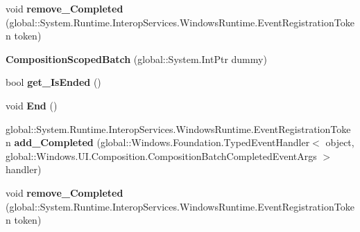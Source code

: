 \begin{DoxyCompactItemize}
\item 
\mbox{\label{class_windows_1_1_u_i_1_1_composition_1_1_composition_scoped_batch_a1fca5e233b1f087147733edf215d083d}} 
void {\bfseries remove\+\_\+\+Completed} (global\+::\+System.\+Runtime.\+Interop\+Services.\+Windows\+Runtime.\+Event\+Registration\+Token token)
\item 
\mbox{\label{class_windows_1_1_u_i_1_1_composition_1_1_composition_scoped_batch_aabd378de67b654d720bcd539222f242d}} 
{\bfseries Composition\+Scoped\+Batch} (global\+::\+System.\+Int\+Ptr dummy)
\item 
\mbox{\label{class_windows_1_1_u_i_1_1_composition_1_1_composition_scoped_batch_ad036352a5e49eca6ca9a5625c9241c44}} 
bool {\bfseries get\+\_\+\+Is\+Ended} ()
\item 
\mbox{\label{class_windows_1_1_u_i_1_1_composition_1_1_composition_scoped_batch_ac9207d343cd71dfa95d2843f2cad44a3}} 
void {\bfseries End} ()
\item 
\mbox{\label{class_windows_1_1_u_i_1_1_composition_1_1_composition_scoped_batch_a2eaf35d8ee5b83da80dbb51535e15735}} 
global\+::\+System.\+Runtime.\+Interop\+Services.\+Windows\+Runtime.\+Event\+Registration\+Token {\bfseries add\+\_\+\+Completed} (global\+::\+Windows.\+Foundation.\+Typed\+Event\+Handler$<$ object, global\+::\+Windows.\+U\+I.\+Composition.\+Composition\+Batch\+Completed\+Event\+Args $>$ handler)
\item 
\mbox{\label{class_windows_1_1_u_i_1_1_composition_1_1_composition_scoped_batch_a1fca5e233b1f087147733edf215d083d}} 
void {\bfseries remove\+\_\+\+Completed} (global\+::\+System.\+Runtime.\+Interop\+Services.\+Windows\+Runtime.\+Event\+Registration\+Token token)
\item 
\mbox{\label{class_windows_1_1_u_i_1_1_composition_1_1_composition_scoped_batch_aabd378de67b654d720bcd539222f242d}} 

\end{DoxyCompactItemize}

